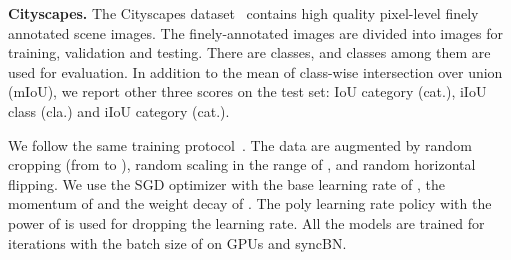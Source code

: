 \documentclass[10pt,twocolumn,letterpaper]{article}
\begin{document}
\vspace{.1cm}
\noindent\textbf{Cityscapes.}
The Cityscapes dataset~\cite{CordtsORREBFRS16} contains  high quality pixel-level finely annotated scene images.
The finely-annotated images are divided into  images for training, validation and testing.
There are  classes, and  classes among them are used for evaluation.
In addition to the mean of class-wise intersection over union (mIoU),
we report other three scores on the test set:
IoU category (cat.), iIoU class (cla.) and iIoU category (cat.).

We follow the same training protocol~\cite{ZhaoSQWJ17, ZhaoZLSLLJ18}.
The data are augmented by random cropping (from  to ), random scaling in the range of , and random horizontal flipping. We use the SGD optimizer with the base learning rate of ,
the momentum of  and the weight decay of . The poly learning rate policy with the power of  is used for dropping the learning rate. All the models are trained for  iterations with the batch size of  on  GPUs and syncBN.
\end{document}
